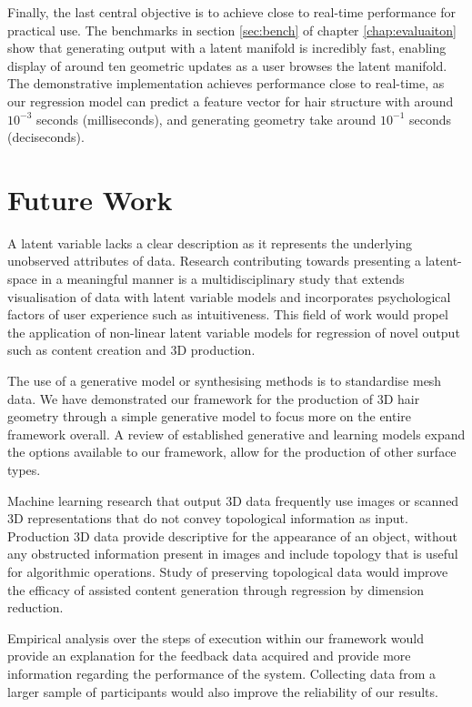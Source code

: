 \documentclass[ %
author={Dillon Keith Diep},
supervisor={Dr. Carl Henrik Ek},
degree={MEng},
title={ART-CG Hair:},
subtitle={Assisted Real-time Content Generation of Stylised Virtual Hair},
type={Research},
year={2017} ]{dissertation}
\begin{document}
Finally, the last central objective is to achieve close to real-time performance for practical use. The benchmarks in section \ref{sec:bench} of chapter \ref{chap:evaluaiton} show that generating output with a latent manifold is incredibly fast, enabling display of around ten geometric updates as a user browses the latent manifold. The demonstrative implementation achieves performance close to real-time, as our regression model can predict a feature vector for hair structure with around $10^{-3}$ seconds (milliseconds), and generating geometry take around $10^{-1}$ seconds (deciseconds).

\section{Future Work}
A latent variable lacks a clear description as it represents the underlying unobserved attributes of data. Research contributing towards presenting a latent-space in a meaningful manner is a multidisciplinary study that extends visualisation of data with latent variable models and incorporates psychological factors of user experience such as intuitiveness. This field of work would propel the application of non-linear latent variable models for regression of novel output such as content creation and 3D production.

The use of a generative model or synthesising methods is to standardise mesh data. We have demonstrated our framework for the production of 3D hair geometry through a simple generative model to focus more on the entire framework overall. A review of established generative and learning models expand the options available to our framework, allow for the production of other surface types.

Machine learning research that output 3D data frequently use images or scanned 3D representations that do not convey topological information as input. Production 3D data provide descriptive for the appearance of an object, without any obstructed information present in images and include topology that is useful for algorithmic operations. Study of preserving topological data would improve the efficacy of assisted content generation through regression by dimension reduction.

Empirical analysis over the steps of execution within our framework would provide an explanation for the feedback data acquired and provide more information regarding the performance of the system. Collecting data from a larger sample of participants would also improve the reliability of our results.
\end{document}
